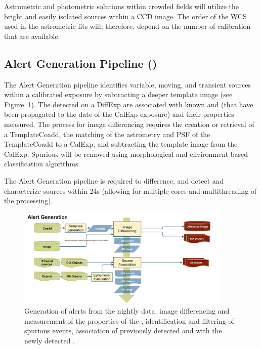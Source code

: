 Astrometric and photometric solutions  within crowded fields will utilize the bright and easily isolated sources within a CCD image. The order of the WCS used in the astrometric fits will, therefore, depend on the number of calibration \Sources that are available.

\subsection{Alert Generation Pipeline (\wbsDiffim)}
\label{sec:apAlertGeneration}

The Alert Generation pipeline identifies variable, moving, and transient sources within a calibrated exposure by subtracting a deeper template image (see Figure~\ref{fig:apAlertgen}). The \DIASources detected on a DiffExp are associated with known \DIAObjects and \SSObjects (that have been propagated to the date of the CalExp exposure) and their properties measured. The process for image differencing requires the creation or retrieval of a TemplateCoadd, the matching of the  astrometry and PSF of the TemplateCoadd to a CalExp, and subtracting the template image from the CalExp. Spurious \DIASources will be removed using morphological and environment based classification algorithms.

The Alert Generation pipeline is required to difference, and detect and characterize \DIASource sources within 24s (allowing for multiple cores and multithreading of the processing).


\begin{figure}[th]
\begin{center}
\includegraphics[width=0.9\textwidth]{figures/Alert_Generation.png}
\caption{\label{fig:apAlertgen} Generation of alerts from the nightly data: image differencing and measurement of the properties of the \DIASources, identification and filtering of spurious events, association of previously detected \DIAObjects and \SSObjects with the newly detected \DIASources. }
\end{center}
\end{figure}
